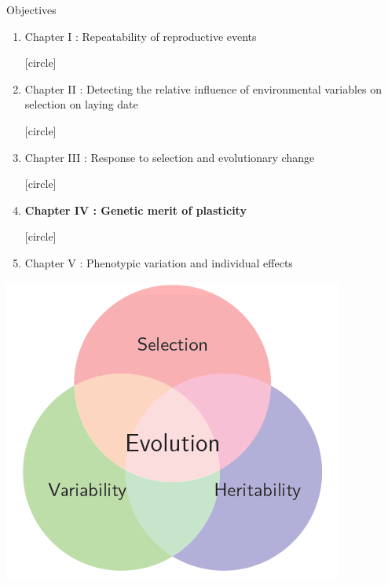 \documentclass[compress]{beamer}
\begin{document}

\begin{frame}{Objectives}
   \begin{enumerate}
  [circle]
\item \normalsize Chapter I : Repeatability of reproductive events
\vspace{0.3cm}

  [circle]
\item \normalsize Chapter II : Detecting the relative influence of environmental variables on selection on laying date  
\vspace{0.3cm}

  [circle]
\item \normalsize Chapter III : Response to selection and evolutionary change
\vspace{0.3cm}

  [circle]
\item \normalsize \textbf{Chapter IV : Genetic merit of plasticity}
\vspace{0.3cm}

  [circle]
\item \normalsize Chapter V : Phenotypic variation and individual effects
\end{enumerate}

\vspace{0.5cm}
\centering
  \includegraphics[height = 3.5 cm]{Image/evolution.png} 

\end{frame}
\end{document}
